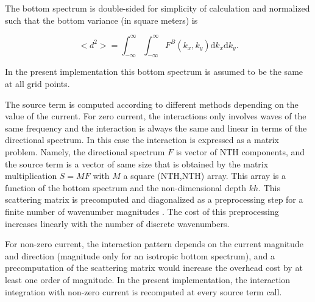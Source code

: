 The bottom spectrum is double-sided for simplicity of calculation
and normalized such that the bottom variance (in square meters) is

\begin{equation}
<d^2> =\int_{-\infty}^{\infty} \int_{-\infty}^{\infty}
F^B(k_x,k_y)  {\mathrm d} k_x  {\mathrm d} k_y.
\end{equation}

\noindent
In the present implementation this bottom spectrum is assumed to be the same
at all grid points.
 
The source term is computed according to different methods depending on the
value of the current. For zero current, the interactions only involves waves
of the same frequency and the interaction is always the same and linear in
terms of the directional spectrum. In this case the interaction is expressed
as a matrix problem. Namely, the directional spectrum $F$ is vector of {\F NTH} components, 
and the source term is a vector of same size that is obtained by 
the matrix multiplication $S = M F$ with $M$ a square ({\F NTH,NTH}) array. This array is 
a function of the bottom spectrum and the non-dimensional depth $kh$.  This 
scattering matrix is precomputed and diagonalized as a
preprocessing step for a finite number of wavenumber magnitudes
\citep{art:AH02}.  The cost of this preprocessing increases linearly with the
number of discrete wavenumbers.

For non-zero current, the interaction pattern depends on the current magnitude
and direction (magnitude only for an isotropic bottom spectrum), and a precomputation of 
the scattering matrix would increase the overhead cost by at least one order of magnitude. In the
present implementation, the interaction integration with non-zero current is recomputed at every
source term call.
